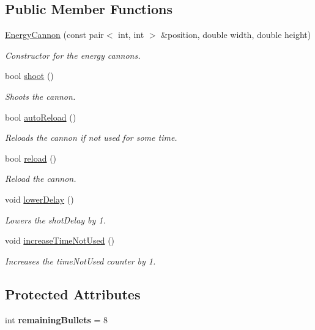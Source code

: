 \subsection*{Public Member Functions}
\begin{DoxyCompactItemize}
\item 
\hyperlink{classGameLogic_1_1EnergyCannon_aa2d03f1f31cc13454d958a0f81c241bc}{Energy\+Cannon} (const pair$<$ int, int $>$ \&position, double width, double height)
\begin{DoxyCompactList}\small\item\em Constructor for the energy cannons. \end{DoxyCompactList}\item 
bool \hyperlink{classGameLogic_1_1EnergyCannon_a8028f1d9d52870997eae9335e9c494f5}{shoot} ()
\begin{DoxyCompactList}\small\item\em Shoots the cannon. \end{DoxyCompactList}\item 
bool \hyperlink{classGameLogic_1_1EnergyCannon_a584235c8d7a30c927338d753ed705968}{auto\+Reload} ()
\begin{DoxyCompactList}\small\item\em Reloads the cannon if not used for some time. \end{DoxyCompactList}\item 
bool \hyperlink{classGameLogic_1_1EnergyCannon_aa83309544f619024d575b88745260d8e}{reload} ()
\begin{DoxyCompactList}\small\item\em Reload the cannon. \end{DoxyCompactList}\item 
void \hyperlink{classGameLogic_1_1EnergyCannon_a29274434c4a4f12bbf829eb4f6fa2559}{lower\+Delay} ()
\begin{DoxyCompactList}\small\item\em Lowers the shot\+Delay by 1. \end{DoxyCompactList}\item 
void \hyperlink{classGameLogic_1_1EnergyCannon_a1499b7d8e1df720b314a263f61e69e7d}{increase\+Time\+Not\+Used} ()
\begin{DoxyCompactList}\small\item\em Increases the time\+Not\+Used counter by 1. \end{DoxyCompactList}\end{DoxyCompactItemize}
\subsection*{Protected Attributes}
\begin{DoxyCompactItemize}
\item 
\mbox{\label{classGameLogic_1_1EnergyCannon_ac08c44df7f23b72b1b99313015026f39}} 
int {\bfseries remaining\+Bullets} = 8
\end{DoxyCompactItemize}
